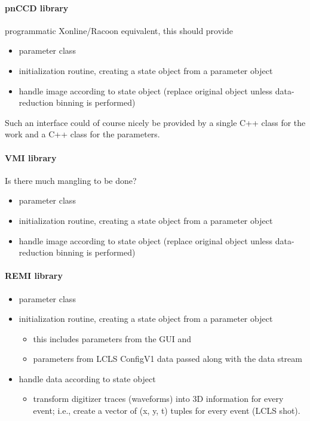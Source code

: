 \documentclass[11pt,a4paper,twoside]{article}
\begin{document}
\paragraph{pnCCD library}
\label{sec:pnccd-library}

programmatic Xonline/Racoon equivalent, this should provide
\begin{itemize}
\item parameter class
\item initialization routine, creating a state object from a parameter object
\item handle image according to state object (replace original object unless data-reduction binning
   is performed)
\end{itemize}
Such an interface could of course nicely be provided by a single C++ class for the work and a C++
class for the parameters.


\paragraph{VMI library}
\label{sec:vmi-library}

Is there much mangling to be done?
\begin{itemize}
\item parameter class
\item initialization routine, creating a state object from a parameter object
\item handle image according to state object (replace original object unless data-reduction binning
   is performed)
\end{itemize}


\paragraph{REMI library}
\label{sec:remi-library}

\begin{itemize}
\item parameter class
\item initialization routine, creating a state object from a parameter object
   \begin{itemize}
   \item this includes parameters from the GUI and
   \item parameters from LCLS ConfigV1 data passed along with the data stream
   \end{itemize}
\item handle data according to state object
   \begin{itemize}
   \item transform digitizer traces (waveforms) into 3D information for every event; i.e., create a
      vector of (x, y, t) tuples for every event (LCLS shot).
   \end{itemize}
\end{itemize}
\end{document}
